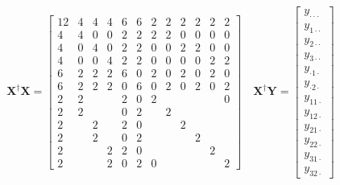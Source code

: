 \documentclass{article}
\begin{document}
\begin{equation*}
\mathbf{X}^{\dagger }\mathbf{X}=\left[ 
\begin{array}{cccccccccccc}
12 & 4 & 4 & 4 & 6 & 6 & 2 & 2 & 2 & 2 & 2 & 2 \\ 
4 & 4 & 0 & 0 & 2 & 2 & 2 & 2 & 0 & 0 & 0 & 0 \\ 
4 & 0 & 4 & 0 & 2 & 2 & 0 & 0 & 2 & 2 & 0 & 0 \\ 
4 & 0 & 0 & 4 & 2 & 2 & 0 & 0 & 0 & 0 & 2 & 2 \\ 
6 & 2 & 2 & 2 & 6 & 0 & 2 & 0 & 2 & 0 & 2 & 0 \\ 
6 & 2 & 2 & 2 & 0 & 6 & 0 & 2 & 0 & 2 & 0 & 2 \\ 
2 & 2 &  &  & 2 & 0 & 2 &  &  &  &  & 0 \\ 
2 & 2 &  &  & 0 & 2 &  & 2 &  &  &  &  \\ 
2 &  & 2 &  & 2 & 0 &  &  & 2 &  &  &  \\ 
2 &  & 2 &  & 0 & 2 &  &  &  & 2 &  &  \\ 
2 &  &  & 2 & 2 & 0 &  &  &  &  & 2 &  \\ 
2 &  &  & 2 & 0 & 2 & 0 &  &  &  &  & 2%
\end{array}%
\right] \quad \mathbf{X}^{\dagger }\mathbf{Y}=\left[ 
\begin{array}{c}
y_{\cdot \cdot \cdot } \\ 
y_{1\cdot \cdot } \\ 
y_{2\cdot \cdot } \\ 
y_{3\cdot \cdot } \\ 
y_{\cdot 1\cdot } \\ 
y_{\cdot 2\cdot } \\ 
y_{11\cdot } \\ 
y_{12\cdot } \\ 
y_{21\cdot } \\ 
y_{22\cdot } \\ 
y_{31\cdot } \\ 
y_{32\cdot }%
\end{array}%
\right] 
\end{equation*}

\bigskip 
\end{document}
